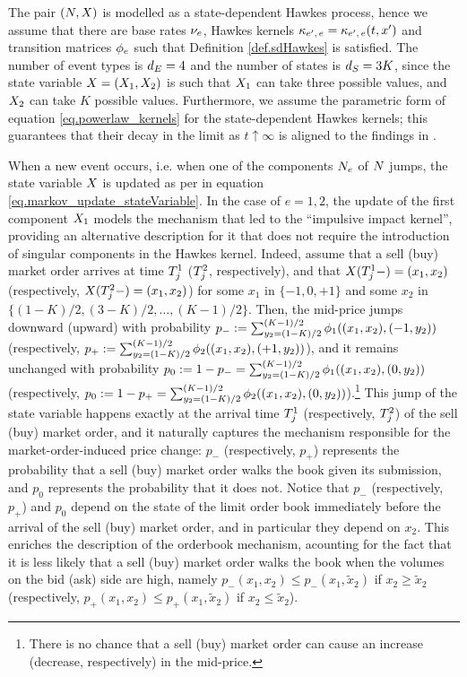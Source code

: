 \documentclass[10pt, article,table]{article}
\begin{document}
The pair $(\multiCountingProc, \stateVariable)$ is modelled as a state-dependent Hawkes process, hence we assume that there are base rates $\baseRate_e$, Hawkes kernels $\hawkesKernel\subscriptee=\hawkesKernel\subscriptee(t, \xone)$ and transition matrices $\transProb_e$ such that  Definition \ref{def.sdHawkes} is satisfied. The number of event types is $\numEventTypes = 4$ and the number of states is $\numStates = 3K$, since the state variable $\stateVariable = (\stateVariable_1, \stateVariable_2)$ is such that $\stateVariable_1$ can take three possible values, and $\stateVariable_2$ can take $K$ possible values. Furthermore, we assume the parametric form of equation \eqref{eq.powerlaw_kernels} for the state-dependent Hawkes kernels; this guarantees that their decay in the limit as $t\uparrow\infty$ is aligned to the findings in \citealp{BM14haw}. 

When a new event occurs, i.e. when one of the components $\countingProc$ of $\multiCountingProc$ jumps, the state variable $\stateVariable$ is updated as per in equation \eqref{eq.markov_update_stateVariable}. In the case of $e=1,2$, the update of the first component $\stateVariable_1$ models the mechanism that led to the ``impulsive impact kernel'', providing an alternative description for it that does not require the introduction of singular components in the Hawkes kernel. Indeed, assume that a sell (buy) market order arrives at time $\arrivalTimes[1]_j$ ($\arrivalTimes[2]_j$, respectively), and that $\stateVariable(\arrivalTimes[1]_j -) = (x_1,x_2)$ (respectively, $\stateVariable(\arrivalTimes[2]_j -) = (x_1,x_2)$) for some $x_1$ in $\lbrace -1, 0, +1\rbrace$ and some $x_2$ in $\lbrace (1-K)/2, (3-K)/2, \dots, (K-1)/2 \rbrace$. Then, the mid-price jumps downward (upward) with probability $p_{-}:=\sum_{y_2 = (1-K)/2}^{(K-1)/2} \transProb_{1}((x_1, x_2), (-1,y_2))$ (respectively, $p_{+}:=\sum_{y_2 = (1-K)/2}^{(K-1)/2} \transProb_{2}((x_1, x_2), (+1,y_2))$), and it remains unchanged with probability $p_{0}:=1-p_{-}=\sum_{y_2 = (1-K)/2}^{(K-1)/2} \transProb_{1}((x_1, x_2), (0,y_2))$  (respectively, $p_{0}:=1-p_{+}=\sum_{y_2 = (1-K)/2}^{(K-1)/2} \transProb_{2}((x_1, x_2), (0,y_2))$).\footnote{ There is no chance that a sell (buy) market order can cause an increase (decrease, respectively) in the mid-price.} This jump of the state variable happens exactly at the arrival time $\arrivalTimes[1]_j$ (respectively, $\arrivalTimes[2]_j$)  of the sell (buy) market order, and it naturally captures the mechanism responsible for the market-order-induced price change: $p_{-}$ (respectively, $p_{+}$) represents the probability that a sell (buy) market order  walks the book given its submission, and $p_{0}$  represents the probability that it does not. Notice that $p_{-}$ (respectively, $p_{+}$) and $p_{0}$ depend on the state of the limit order book immediately before the arrival of the sell (buy) market order, and in particular they depend on $x_2$. This enriches the description of the orderbook mechanism, acounting for the fact that it is less likely that a sell (buy) market order walks the book when the volumes on the bid (ask) side are high, namely $p_{-}(x_1,x_2) \leq p_{-}(x_1,\tilde{x}_2)$ if $x_2\geq \tilde{x}_2$ (respectively, $p_{+}(x_1,x_2) \leq p_{+}(x_1,\tilde{x}_2)$ if $x_2\leq \tilde{x}_2$).
\end{document}
